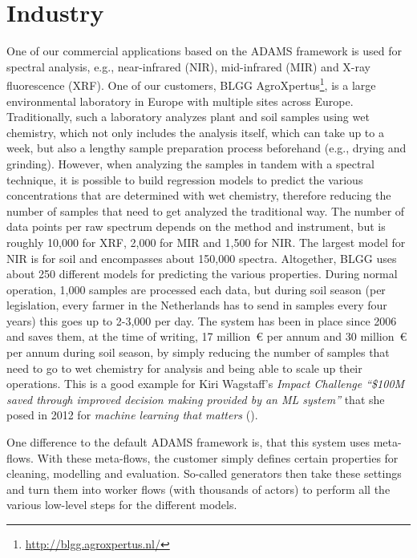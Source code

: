 \documentclass[wcp]{jmlr}
\begin{document}
\section{Industry}
One of our commercial applications based on the ADAMS framework is used for spectral analysis, e.g., near-infrared (NIR), mid-infrared (MIR) and X-ray fluorescence (XRF). One of our customers, BLGG AgroXpertus\footnote{\url{http://blgg.agroxpertus.nl/}{}}, is a large environmental laboratory in Europe with multiple sites across Europe. Traditionally, such a laboratory analyzes plant and soil samples using wet chemistry, which not only includes the analysis itself, which can take up to a week, but also a lengthy sample preparation process beforehand (e.g., drying and grinding). However, when analyzing the samples in tandem with a spectral technique, it is possible to build regression models to predict the various concentrations that are determined with wet chemistry, therefore reducing the number of samples that need to get analyzed the traditional way. The number of data points per raw spectrum depends on the method and instrument, but is roughly 10,000 for XRF, 2,000 for MIR and 1,500 for NIR. The largest model for NIR is for soil and encompasses about 150,000 spectra. Altogether, BLGG uses about 250 different models for predicting the various properties. During normal operation, 1,000 samples are processed each data, but during soil season (per legislation, every farmer in the Netherlands has to send in samples every four years) this goes up to 2-3,000 per day. The system has been in place since 2006 and saves them, at the time of writing, 17 million~\euro{} per annum and 30 million~\euro{} per annum during soil season, by simply reducing the number of samples that need to go to wet chemistry for analysis and being able to scale up their operations. This is a good example for Kiri Wagstaff's \textit{Impact Challenge ``\$100M saved through improved decision making provided by an ML system''} that she posed in 2012 for \textit{machine learning that matters} (\cite{wagstaff}).

One difference to the default ADAMS framework is, that this system uses meta-flows. With these meta-flows, the customer simply defines certain properties for cleaning, modelling and evaluation. So-called generators then take these settings and turn them into worker flows (with thousands of actors) to perform all the various low-level steps for the different models.



\end{document}
